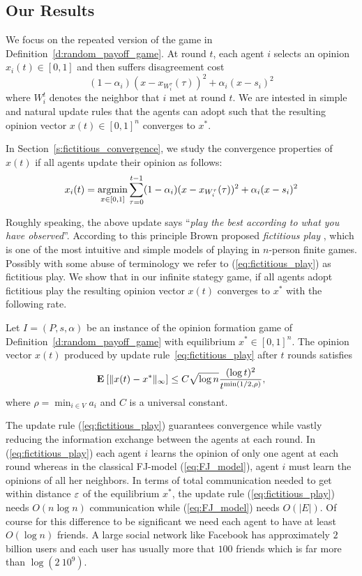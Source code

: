 \subsection{Our Results}

We focus on the repeated version of the game in Definition~\ref{d:random_payoff_game}. 
At round $t$, each agent $i$ selects an opinion $x_i(t) \in [0,1]$ and then suffers
disagreement cost \[(1-\alpha_i)(x-x_{W_i^\tau}(\tau))^2+\alpha_i(x-s_i)^2 \]
where $W_i^t$ denotes the neighbor that $i$ met at round $t$. 
We are intested in simple and natural update rules
that the agents can adopt such that the resulting opinion 
vector $x(t) \in [0,1]^n$ converges to $x^*$.

In Section~\ref{s:fictitious_convergence}, 
we study the convergence properties of $x(t)$ if all agents 
update their opinion as follows:
\begin{equation}\label{eq:fictitious_play}
x_i(t) =\operatorname*{argmin}_{x \in [0,1]}\sum_{\tau=0}^{t-1}(1-\alpha_i)(x-x_{W_i^\tau}(\tau))^2+\alpha_i(x-s_i)^2
\end{equation}

\noindent Roughly speaking, the above update says \enquote{\emph{play the best according to what
you have observed}}. According to this principle Brown proposed \emph{fictitious play} \cite{B49,B51}, which is 
one of the most intuitive and simple models of playing in $n$-person finite games.
Possibly with some abuse of terminology we refer to (\ref{eq:fictitious_play})
as fictitious play. We show that in our infinite stategy game, if all agents 
adopt fictitious play the resulting 
opinion vector $x(t)$ converges to $x^*$ with the following
rate.
\begin{theorem}\label{t:fictitious_convergence}
  Let $I = (P,s, \alpha)$ be an instance of the opinion formation
  game of Definition~\ref{d:random_payoff_game} with equilibrium
  $x^* \in [0,1]^n$.  The opinion vector $x(t)$ produced by
  update rule~\ref{eq:fictitious_play} after $t$ rounds satisfies
  \[
    \bm{\mathrm{E}}_{} \left[ \| x(t) - x^* \|_{\infty} \right] \leq
    C \sqrt{\log n}\frac{(\log t)^{2}}{t^{\min(1/2,\rho)}},
  \]
  where $\rho = \min_{i \in V} a_i$ and $C$ is a universal constant.
\end{theorem}

The update rule (\ref{eq:fictitious_play}) guarantees convergence
while vastly reducing the information exchange between the agents
at each round. In (\ref{eq:fictitious_play}) each agent $i$ learns the opinion of only one agent
at each round whereas in the classical FJ-model (\ref{eq:FJ_model}), agent $i$ must
learn the opinions of all her neighbors. In terms of
total communication needed to get within distance $\varepsilon$ of the
equilibrium $x^*$, the update rule (\ref{eq:fictitious_play}) needs
$O(n \log n)$ communication while (\ref{eq:FJ_model}) needs
$O(|E|)$. Of course for this difference to be significant we need
each agent to have at least $O(\log n)$ friends. A large social
network like Facebook has approximately $2$ billion users and each user
has usually more that $100$ friends which is far more than $\log(2\ 10^9)$.

